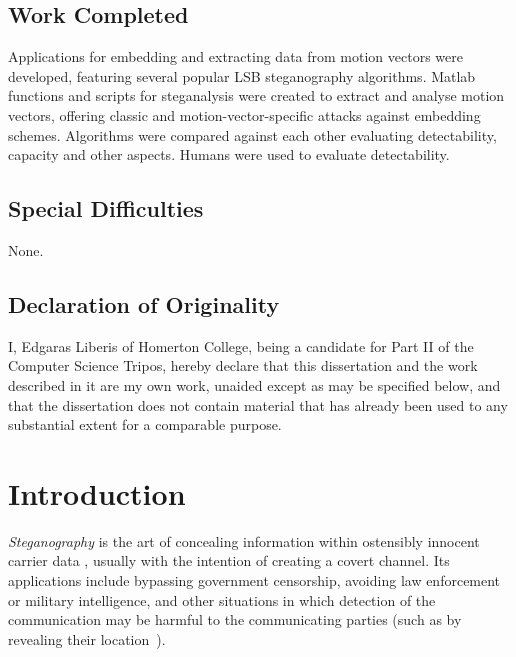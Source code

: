 \documentclass[12pt,british,twoside,notitlepage,usenames,dvipsnames,hypens,final]{report}
\renewcommand\thesubsection{\arabic{subsection}.}
\numberwithin{equation}{section}
\numberwithin{figure}{section}
\begin{document}
\section*{Work Completed}

Applications for embedding and extracting data from motion vectors were developed, featuring several popular LSB steganography algorithms. Matlab functions and scripts for steganalysis were created to extract and analyse motion vectors, offering classic and motion-vector-specific attacks against embedding schemes. Algorithms were compared against each other evaluating detectability, capacity and other aspects. Humans were used to evaluate detectability.

\section*{Special Difficulties}

None.

\cleardoublepage

\section*{Declaration of Originality}
I, Edgaras Liberis of Homerton College, being a candidate for Part II of the Computer Science Tripos, hereby declare that this dissertation and the work described in it are my own work, unaided except as may be specified below, and that the dissertation does not contain material that has already been used to any substantial extent for a comparable purpose.

\bigskip
{}

\medskip
{}

\cleardoublepage
\tableofcontents
\renewcommand{\thesection}{\arabic{chapter}.\arabic{section}}
\renewcommand{\thesubsection}{\arabic{chapter}.\arabic{section}.\arabic{subsection}}
\setcounter{chapter}{0}

\cleardoublepage
\chapter{Introduction}
\pagestyle{headings}
\setcounter{page}{1}

\emph{Steganography} is the art of concealing information within ostensibly innocent carrier data \cite[p.~3]{fridrich}, usually with the intention of creating a covert channel. Its applications include bypassing government censorship, avoiding law enforcement or military intelligence, and other situations in which detection of the communication may be harmful to the communicating parties (such as by revealing their location~\cite{infohiding-survey}). 
 
\end{document}
